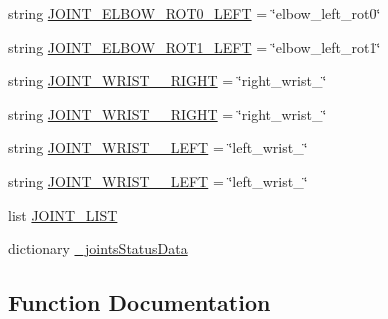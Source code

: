 \begin{DoxyCompactItemize}
\item 
string \mbox{\hyperlink{namespacecapture__steering__trajectory_ad4389e4fde10bc5116ff41f9c665b97d}{J\+O\+I\+N\+T\+\_\+\+E\+L\+B\+O\+W\+\_\+\+R\+O\+T0\+\_\+\+L\+E\+FT}} = \char`\"{}elbow\+\_\+left\+\_\+rot0\char`\"{}
\item 
string \mbox{\hyperlink{namespacecapture__steering__trajectory_a4bd899abad67160366539e730c9a32c9}{J\+O\+I\+N\+T\+\_\+\+E\+L\+B\+O\+W\+\_\+\+R\+O\+T1\+\_\+\+L\+E\+FT}} = \char`\"{}elbow\+\_\+left\+\_\+rot1\char`\"{}
\item 
string \mbox{\hyperlink{namespacecapture__steering__trajectory_ad3107c84ba4df9ac495fcf630599e3e2}{J\+O\+I\+N\+T\+\_\+\+W\+R\+I\+S\+T\+\_\+\_\+\+R\+I\+G\+HT}} = \char`\"{}right\+\_\+wrist\+\_\char`\"{}
\item 
string \mbox{\hyperlink{namespacecapture__steering__trajectory_a7bfc8b1da3a1d1c18a194b5e54a81cb7}{J\+O\+I\+N\+T\+\_\+\+W\+R\+I\+S\+T\+\_\+\_\+\+R\+I\+G\+HT}} = \char`\"{}right\+\_\+wrist\+\_\char`\"{}
\item 
string \mbox{\hyperlink{namespacecapture__steering__trajectory_ae9904640424ea5d00d5777af56b46b3d}{J\+O\+I\+N\+T\+\_\+\+W\+R\+I\+S\+T\+\_\+\_\+\+L\+E\+FT}} = \char`\"{}left\+\_\+wrist\+\_\char`\"{}
\item 
string \mbox{\hyperlink{namespacecapture__steering__trajectory_a49568e3ec1acc39da59932ffed598759}{J\+O\+I\+N\+T\+\_\+\+W\+R\+I\+S\+T\+\_\+\_\+\+L\+E\+FT}} = \char`\"{}left\+\_\+wrist\+\_\char`\"{}
\item 
list \mbox{\hyperlink{namespacecapture__steering__trajectory_a52033897abeb098cf618b271e3946e31}{J\+O\+I\+N\+T\+\_\+\+L\+I\+ST}}
\item 
dictionary \mbox{\hyperlink{namespacecapture__steering__trajectory_ad203f2851f945931bc766776c29e87ab}{\+\_\+joints\+Status\+Data}}
\end{DoxyCompactItemize}


\subsection{Function Documentation}
\mbox{\label{namespacecapture__steering__trajectory_accdf88c81768a607b05d95a281c536a2}} 

